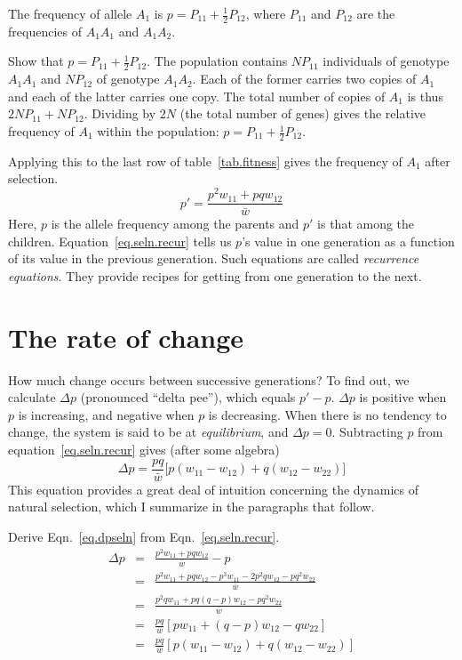 \documentclass[11pt]{article}
\begin{document}
The frequency of allele $A_1$ is $p = P_{11} + \frac{1}{2}
P_{12}$, where $P_{11}$ and $P_{12}$ are the frequencies of
$A_1A_1$ and $A_1A_2$.  
\begin{exercise}
Show that $p = P_{11} + \frac{1}{2}P_{12}$.
\answer
The population contains $NP_{11}$ individuals of genotype $A_1A_1$ and
$NP_{12}$ of genotype $A_1A_2$.  Each of the former carries two copies
of $A_1$ and each of the latter carries one copy.  The total number of
copies of $A_1$ is thus $2NP_{11} + NP_{12}$.  Dividing by $2N$ (the total
number of genes) gives the relative frequency of $A_1$ within the
population: $p = P_{11} + \frac{1}{2}P_{12}$.
\end{exercise}
Applying this to the last row of table~\ref{tab.fitness} gives the
frequency of $A_1$ after selection.
\begin{equation}
p' = \frac{p^{2} w_{11} + pqw_{12}}{\bar w}
\label{eq.seln.recur}
\end{equation}
Here, $p$ is the allele frequency among the parents and $p'$ is that
among the children.  Equation~\ref{eq.seln.recur} tells us $p$'s value
in one generation as a function of its value in the previous
generation.  Such equations are called \emph{recurrence equations}.
They provide recipes for getting from one generation to the next.

\section{The rate of change}
\label{sec.deltap}
How much change occurs between successive generations?  To find out,
we calculate $\Delta p$ (pronounced ``delta pee''), which equals $p' -
p$.  $\Delta p$ is positive when $p$ is increasing, and negative when
$p$ is decreasing.  When there is no tendency to change, the system is
said to be at \emph{equilibrium}, and $\Delta p = 0$.  Subtracting $p$
from equation~\ref{eq.seln.recur} gives (after some algebra)
\begin{equation}
  \Delta p = \frac{p q}{\bar w}
  \bigl[p (w_{11}-w_{12}) + q(w_{12} - w_{22})\bigr]
\label{eq.dpseln}
\end{equation}
This equation provides a great deal of intuition concerning the dynamics of
natural selection, which I summarize in the paragraphs that follow.

\begin{exercise}
  Derive Eqn.~\ref{eq.dpseln} from Eqn.~\ref{eq.seln.recur}.
  \answer
  \begin{eqnarray*}
\Delta p &=& \frac{p^{2} w_{11} + pqw_{12}}{\bar w} - p\\
   &=& \frac{p^{2} w_{11} + pqw_{12} - p^3 w_{11} - 2p^2q w_{12} -
  pq^2 w_{22}}{\bar w}\\
   &=& \frac{p^{2}q w_{11} + pq(q-p)w_{12} - pq^2 w_{22}}{\bar w}\\
   &=& \frac{pq}{\bar w}[pw_{11} + (q-p)w_{12} - q w_{22}]\\
   &=& \frac{pq}{\bar w}[p(w_{11}-w_{12}) + q(w_{12} - w_{22})]\\
  \end{eqnarray*}    
\end{exercise}  
\end{document}
